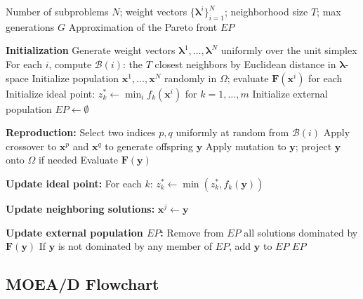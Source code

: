 \documentclass[12pt,a4paper]{article}
\begin{document}
\begin{algorithm}[H]
\caption{MOEA/D: Multi-Objective Evolutionary Algorithm based on Decomposition}
\label{alg:moead}
\begin{algorithmic}[1]
\Require Number of subproblems $N$; weight vectors $\{\boldsymbol{\lambda}^i\}_{i=1}^N$; neighborhood size $T$; max generations $G$
\Ensure Approximation of the Pareto front $EP$

\State \textbf{Initialization}
\State \quad Generate weight vectors $\boldsymbol{\lambda}^1, \ldots, \boldsymbol{\lambda}^N$ uniformly over the unit simplex
\State \quad For each $i$, compute $\mathcal{B}(i)$: the $T$ closest neighbors by Euclidean distance in $\boldsymbol{\lambda}$-space
\State \quad Initialize population $\mathbf{x}^1, \ldots, \mathbf{x}^N$ randomly in $\Omega$; evaluate $\mathbf{F}(\mathbf{x}^i)$ for each
\State \quad Initialize ideal point: $z_k^* \leftarrow \min_i f_k(\mathbf{x}^i)$ for $k = 1, \ldots, m$
\State \quad Initialize external population $EP \leftarrow \emptyset$

        \State \textbf{Reproduction:}
        \State \quad Select two indices $p, q$ uniformly at random from $\mathcal{B}(i)$
        \State \quad Apply crossover to $\mathbf{x}^p$ and $\mathbf{x}^q$ to generate offspring $\mathbf{y}$
        \State \quad Apply mutation to $\mathbf{y}$; project $\mathbf{y}$ onto $\Omega$ if needed
        \State \quad Evaluate $\mathbf{F}(\mathbf{y})$

        \State \textbf{Update ideal point:}
        \State \quad For each $k$: $z_k^* \leftarrow \min(z_k^*, f_k(\mathbf{y}))$

        \State \textbf{Update neighboring solutions:}
                \State $\mathbf{x}^j \leftarrow \mathbf{y}$ 
            \EndIf
        \EndFor

        \State \textbf{Update external population $EP$:}
        \State \quad Remove from $EP$ all solutions dominated by $\mathbf{F}(\mathbf{y})$
        \State \quad If $\mathbf{y}$ is not dominated by any member of $EP$, add $\mathbf{y}$ to $EP$
    \EndFor
\EndFor
\State \Return $EP$
\end{algorithmic}
\end{algorithm}

\subsection{MOEA/D Flowchart}
\end{document}
